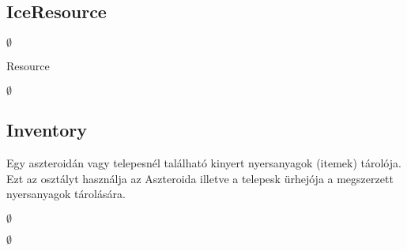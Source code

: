 \subsection{IceResource}
\begin{class-template-responsibility}

\end{class-template-responsibility}
\begin{class-template-interface}
$\emptyset$
\end{class-template-interface}
\begin{class-template-baseclass}
Resource
\end{class-template-baseclass}
\begin{class-template-attribute}
\item[] $\emptyset$
\end{class-template-attribute}
\begin{class-template-method}
\end{class-template-method}


\subsection{Inventory}
\begin{class-template-responsibility}
Egy aszteroidán vagy telepesnél található kinyert nyersanyagok (itemek) tárolója.
Ezt az osztályt használja az Aszteroida illetve a telepesk ürhejója a megszerzett nyersanyagok tárolására.
\end{class-template-responsibility}
\begin{class-template-interface}
$\emptyset$
\end{class-template-interface}
\begin{class-template-baseclass}
$\emptyset$
\end{class-template-baseclass}
\begin{class-template-attribute}
\end{class-template-attribute}
\begin{class-template-method}
\end{class-template-method}


